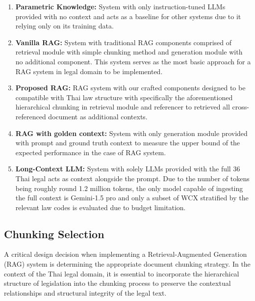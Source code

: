 \begin{enumerate}
    \item \textbf{Parametric Knowledge: }System with only instruction-tuned LLMs provided with no context and acts as a baseline for other systems due to it relying only on its training data.
    \item \textbf{Vanilla RAG: }System with traditional RAG components comprised of retrieval module with simple chunking method and generation module with no additional component. This system serves as the most basic approach for a RAG system in legal domain to be implemented.
    \item \textbf{Proposed RAG: }RAG system with our crafted components designed to be compatible with Thai law structure with specifically the aforementioned hierarchical chunking in retrieval module and referencer to retrieved all cross-referenced document as additional contexts.
    \item \textbf{RAG with golden context: }System with only generation module provided with prompt and ground truth context to measure the upper bound of the expected performance in the case of RAG system.
    \item \textbf{Long-Context LLM: }System with solely LLMs provided with the full 36 Thai legal acts as context alongside the prompt. Due to the number of tokens being roughly round 1.2 million tokens, the only model capable of ingesting the full context is Gemini-1.5 pro and only a subset of WCX stratified by the relevant law codes is evaluated due to budget limitation.
\end{enumerate}

\subsection{Chunking Selection}
\label{subsec:chunking_select}

A critical design decision when implementing a Retrieval-Augmented Generation (RAG) system is determining the appropriate document chunking strategy. In the context of the Thai legal domain, it is essential to incorporate the hierarchical structure of legislation into the chunking process to preserve the contextual relationships and structural integrity of the legal text.

